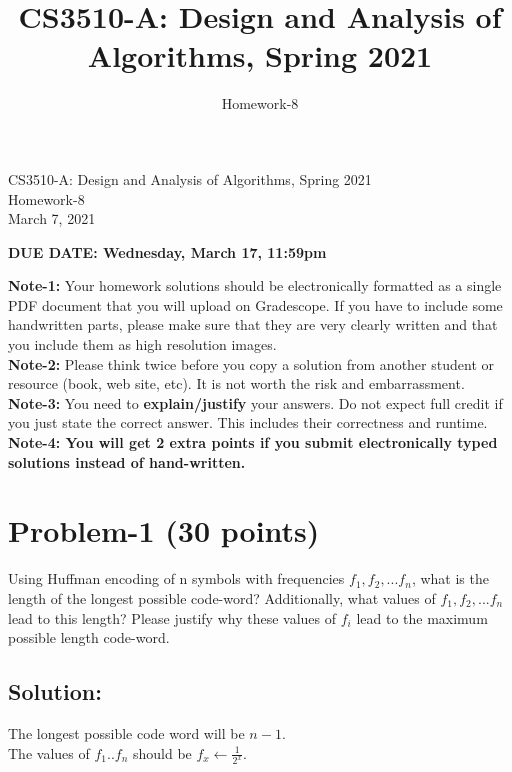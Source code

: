 \documentclass[11pt]{article}
\title{CS3510-A: Design and Analysis of Algorithms, Spring 2021}
\author{Homework-8}
\begin{document}
\begin{center}
    
    \LARGE CS3510-A: Design and Analysis of Algorithms, Spring 2021 \\ \vspace{1em} 
    \large Homework-8 \\ \vspace{0.5em}
    March 7, 2021
\end{center}
\thispagestyle{empty}
\pagestyle{empty}

\noindent
\begin{center}
{\bf DUE DATE: Wednesday, March 17, 11:59pm}
\end{center}

\noindent
{\bf Note-1:} Your homework solutions should be electronically formatted as a single PDF document that you will upload on Gradescope. 
If you have to include some handwritten parts, please make sure that they are very clearly written and that you include them as high resolution images. \\

\noindent
{\bf Note-2:} Please think twice before you copy a solution from another student or resource (book, web site, etc). 
It is not worth the risk and embarrassment. \\

\noindent
{\bf Note-3:} You need to {\bf explain/justify} your answers. Do not expect full credit if you just state the correct answer. This includes their correctness and runtime.\\

\noindent
{\bf Note-4: You will get 2 extra points if you submit electronically typed solutions instead of hand-written.} 

\newpage
\section*{Problem-1 (30 points)}

Using Huffman encoding of n symbols with frequencies $f_1, f_2, ... f_n$, what is the length of the longest possible code-word? Additionally, what values of $f_1, f_2, ... f_n$ lead to this length? Please justify why these values of $f_i$ lead to the maximum possible length code-word.

\subsection*{Solution:}
The longest possible code word will be $n-1$.\\
The values of $f_1 .. f_n$ should be $f_x \gets \frac{1}{2^x}$.
\end{document}
